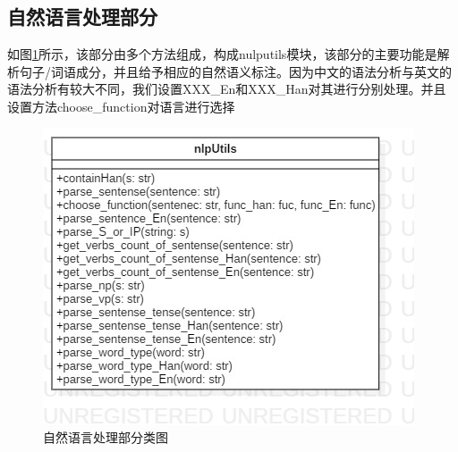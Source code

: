     \subsection{自然语言处理部分}
	如图\ref{classDiagram_nlputils}所示，该部分由多个方法组成，构成nulputils模块，该部分的主要功能是解析句子/词语成分，并且给予相应的自然语义标注。因为中文的语法分析与英文的语法分析有较大不同，我们设置XXX\_En和XXX\_Han对其进行分别处理。并且设置方法choose\_function对语言进行选择
    	\begin{figure}
	\centering
	\includegraphics[width=.5\textwidth]{./src/classDiagram_nlputils.jpg} 
	\caption{自然语言处理部分类图} 
	\label{classDiagram_nlputils}
	\end{figure}
